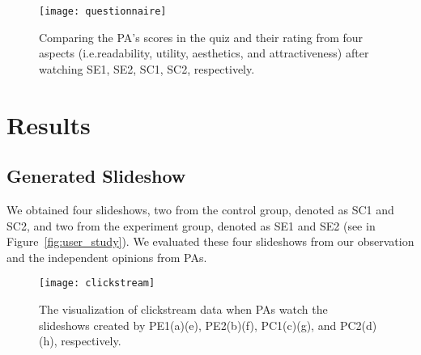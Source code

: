 \begin{figure}
 \centering %
 \texttt{[image: questionnaire]}
 \caption{Comparing the PA's scores in  the quiz and their rating from four aspects (i.e.readability, utility, aesthetics, and attractiveness) after watching SE1, SE2, SC1, SC2, respectively. 
 }
 \label{fig:questionnaire}
\end{figure}

\section{Results}
\subsection{Generated Slideshow}
We obtained four slideshows, two from the control group, denoted as SC1 and SC2, and two from the experiment group, denoted as SE1 and SE2 (see in Figure~\ref{fig:user_study}). We evaluated these four slideshows from our observation and the independent opinions from PAs. 



\begin{figure}
 \centering %
 \texttt{[image: clickstream]}
 \caption{The visualization of clickstream data when PAs watch the slideshows created by PE1(a)(e), PE2(b)(f), PC1(c)(g), and PC2(d)(h), respectively. 
 }
 \label{fig:clickstream}
\end{figure}

